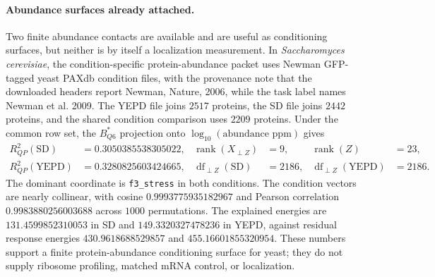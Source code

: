 \paragraph{Abundance surfaces already attached.}
Two finite abundance contacts are available and are useful as conditioning surfaces, but neither is by itself a localization measurement. In \emph{Saccharomyces cerevisiae}, the condition-specific protein-abundance packet uses Newman GFP-tagged yeast PAXdb condition files, with the provenance note that the downloaded headers report Newman, Nature, 2006, while the task label names Newman et al. 2009. The YEPD file joins $2517$ proteins, the SD file joins $2442$ proteins, and the shared condition comparison uses $2209$ proteins. Under the common row set, the $B^{*}_{Q6}$ projection onto $\log_{10}(\text{abundance ppm})$ gives
$$
\begin{aligned}
R^2_{QP}(\mathrm{SD})&=0.3050385538305022, & \operatorname{rank}(X_{\perp Z})&=9, & \operatorname{rank}(Z)&=23,\\
R^2_{QP}(\mathrm{YEPD})&=0.3280825603424665, & \operatorname{df}_{\perp Z}(\mathrm{SD})&=2186, & \operatorname{df}_{\perp Z}(\mathrm{YEPD})&=2186.
\end{aligned}
$$
The dominant coordinate is \texttt{f3\_stress} in both conditions. The condition vectors are nearly collinear, with cosine $0.9993775935182967$ and Pearson correlation $0.9983880256003688$ across $1000$ permutations. The explained energies are $131.4599852310053$ in SD and $149.3320327478236$ in YEPD, against residual response energies $430.9618688529857$ and $455.16601855320954$. These numbers support a finite protein-abundance conditioning surface for yeast; they do not supply ribosome profiling, matched mRNA control, or localization.

